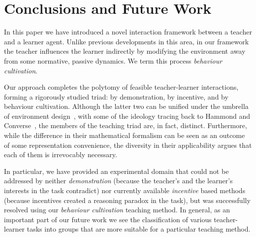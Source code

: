 \section{Conclusions and Future Work}\label{sec: future work}
\noindent
In this paper we have introduced a novel interaction framework between
a teacher and a learner agent. Unlike previous developments in this
area, in our framework the teacher influences the learner indirectly by
modifying the environment away from some normative, passive
dynamics. We term this process {\em behaviour cultivation}.

Our approach completes the polytomy of feasible teacher-learner
interactions, forming a rigorously studied triad: by demonstration, by
incentive, and by behaviour cultivation. Although the latter two can
be unified under the umbrella of environment
design~\cite{Zhang09:General}, with some of the ideology tracing back
to Hammond and Converse~\cite{hammond_converse_91}, the members of the
teaching triad are, in fact, distinct. Furthermore, while the
difference in their mathematical formalism can be seen as an outcome
of some representation convenience, the diversity in their
applicability argues that each of them is irrevocably necessary.


In particular, we have provided an experimental domain that could not
be addressed by neither {\em demonstration} (because the teacher's and
the learner's interests in the task contradict) nor currently
available {\em incentive} based methods (because incentives created a
reasoning paradox in the task), but was successfully resolved using
our {\em behaviour cultivation} teaching method. In general, as an
important part of our future work we see the classification of various
teacher-learner tasks into groups that are more suitable for a
particular teaching method.


